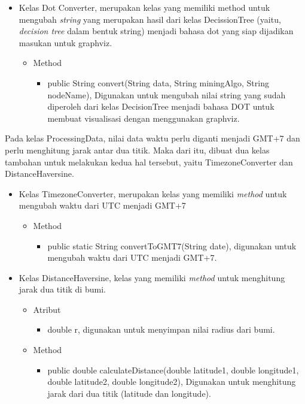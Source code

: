 \begin{itemize}
	\item Kelas Dot Converter, merupakan kelas yang memiliki method untuk mengubah \textsl{string} yang merupakan hasil dari kelas DecissionTree (yaitu, \textsl{decision tree} dalam bentuk string) menjadi bahasa dot yang siap dijadikan masukan untuk graphviz.
	\begin{itemize}
		\item Method
		\begin{itemize}
			\item public String convert(String data, String miningAlgo, String nodeName), Digunakan untuk mengubah nilai string yang sudah diperoleh dari kelas DecisionTree menjadi bahasa DOT untuk membuat visualisasi dengan menggunakan graphviz.
		\end{itemize}
	\end{itemize}
\end{itemize}
	
	Pada kelas ProcessingData, nilai data waktu perlu diganti menjadi GMT+7 dan perlu menghitung jarak antar dua titik. Maka dari itu, dibuat dua kelas tambahan untuk melakukan kedua hal tersebut, yaitu TimezoneConverter dan DistanceHaversine.
	
\begin{itemize}
	\item Kelas TimezoneConverter, merupakan kelas yang memiliki \textsl{method} untuk mengubah waktu dari UTC menjadi GMT+7
	\begin{itemize}
		\item Method
		\begin{itemize}
			\item public static String convertToGMT7(String date), digunakan untuk mengubah waktu dari UTC menjadi GMT+7.
		\end{itemize}
	\end{itemize}

	\item Kelas DistanceHaversine, kelas yang memiliki \textsl{method} untuk menghitung jarak dua titik di bumi.
	\begin{itemize}
		\item Atribut
		\begin{itemize}
			\item double r, digunakan untuk menyimpan nilai radius dari bumi.
		\end{itemize}
		\item Method
		\begin{itemize}
			\item public double calculateDistance(double latitude1, double longitude1, double latitude2, double longitude2), Digunakan untuk menghitung jarak dari dua titik (latitude dan longitude).
		\end{itemize}
	\end{itemize}
\end{itemize}

